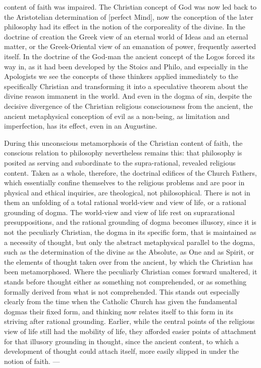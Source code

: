 content of faith was impaired. The Christian concept of God was now led back to the Aristotelian determination of  [perfect Mind], now the conception of the later philosophy had its effect in the notion of the corporeality of the divine. In the doctrine of creation the Greek view of an eternal world of Ideas and an eternal matter, or the Greek-Oriental view of an emanation of power, frequently asserted itself.
In the doctrine of the God-man the ancient concept of the Logos forced its way in, as it had been developed by the Stoics and Philo, and especially in the Apologists we see the concepts of these thinkers applied immediately to the specifically Christian and transforming it into a speculative theorem about the divine reason immanent in the world. And even in the dogma of sin, despite the decisive divergence of the Christian religious consciousness from the ancient, the ancient metaphysical conception of evil as a non-being, as limitation and imperfection, has its effect, even in an Augustine.

During this unconscious metamorphosis of the Christian content of faith, the conscious relation to philosophy nevertheless remains this: that philosophy is posited as serving and subordinate to the supra-rational, revealed religious content. Taken as a whole, therefore, the doctrinal edifices of the Church Fathers, which essentially confine themselves to the religious problems and are poor in physical and ethical inquiries, are theological, not philosophical. There is not in them an unfolding of a total rational world-view and view of life, or a rational grounding of dogma. The world-view and view of life rest on suprarational presuppositions, and the rational grounding of dogma becomes illusory, since it is not the peculiarly Christian, the dogma in its specific form, that is maintained as a necessity of thought, but only the abstract metaphysical parallel to the dogma, such as the determination of the divine as the Absolute, as One and as Spirit, or the elements of thought taken over from the ancient, by which the Christian has been metamorphosed. Where the peculiarly Christian comes forward unaltered, it stands before thought either as something not comprehended, or as something formally derived from what is not comprehended. This stands out especially clearly from the time when the Catholic Church has given the fundamental dogmas their fixed form, and thinking now relates itself to this form in its striving after rational grounding. Earlier, while the central points of the religious view of life still had the mobility of life, they afforded easier points of attachment for that illusory grounding in thought, since the ancient content, to which a development of thought could attach itself, more easily slipped in under the notion of faith. ---

